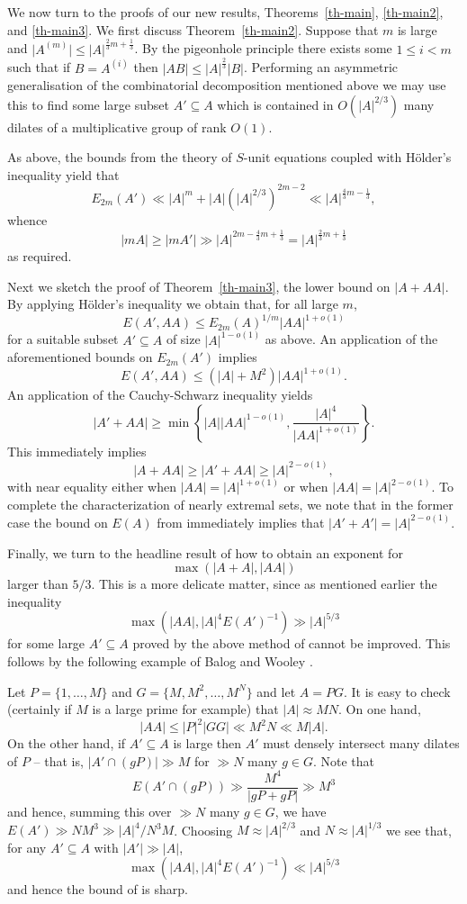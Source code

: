 \documentclass{amsart}
\renewcommand{\leq}{\leqslant}
\renewcommand{\geq}{\geqslant}
\newcommand{\abs}[1]{\left\lvert #1\right\rvert}
\newcommand{\Abs}[1]{\lvert #1\rvert}
\theoremstyle{definition}
\begin{document}
We now turn to the proofs of our new results, Theorems~\ref{th-main}, \ref{th-main2}, and \ref{th-main3}. We first discuss Theorem~\ref{th-main2}. Suppose that $m$ is large and $\Abs{A^{(m)}}\leq \abs{A}^{\frac{2}{3}m+\frac{1}{3}}$. By the pigeonhole principle there exists some $1\leq i<m$ such that if $B=A^{(i)}$ then $\abs{AB}\leq \abs{A}^{\frac{2}{3}}\abs{B}$. Performing an asymmetric generalisation of the combinatorial decomposition mentioned above we may use this to find some large subset $A'\subseteq A$ which is contained in $O(\abs{A}^{2/3})$ many dilates of a multiplicative group of rank $O(1)$. 

As above, the bounds from the theory of $S$-unit equations coupled with H\"{o}lder's inequality yield that
\[E_{2m}(A') \ll \abs{A}^m+\abs{A}(\abs{A}^{2/3})^{2m-2}\ll\abs{A}^{\frac{4}{3}m-\frac{1}{3}},\]
whence
\[\abs{mA}\geq \abs{mA'}\gg \abs{A}^{2m-\frac{4}{3}m+\frac{1}{3}}=\abs{A}^{\frac{2}{3}m+\frac{1}{3}}\]
as required.

Next we sketch the proof of Theorem~\ref{th-main3}, the lower bound on $\abs{A+AA}$. By applying H\"older's inequality we obtain that, for all large $m$,
\[ E(A', AA) \le E_{2m}(A)^{1/m} |AA|^{1+o(1)}\]
for a suitable subset $A' \subseteq A$ of size $\abs{A}^{1-o(1)}$ as above. An application of the aforementioned bounds on $E_{2m}(A')$ implies
\[ E(A', AA) \le (\abs{A} + M^2) |AA|^{1+o(1)}.\] An application of the Cauchy-Schwarz inequality yields
\[ |A'+AA| \ge \min\left\{ \abs{A} \abs{AA}^{1-o(1)} , \frac{\abs{A}^4}{\abs{AA}^{1+o(1)}}\right\}.\]
This immediately implies 
\[ \abs{A+AA} \ge \abs{A'+AA} \ge \abs{A}^{2-o(1)},\]
with near equality either when $\abs{AA} = \abs{A}^{1+o(1)}$ or when $\abs{AA} = \abs{A}^{2-o(1)}$. To complete the characterization of nearly extremal sets, we note that in the former case the bound on $E(A)$ from \cite{HRSZ25} immediately implies that $\abs{A'+A'} = \abs{A}^{2-o(1)}$.

Finally, we turn to the headline result of how to obtain an exponent for 
\[\max(\abs{A+A},\abs{AA})\]
larger than $5/3$. This is a more delicate matter, since as mentioned earlier the inequality
\[\max(\abs{AA},\abs{A}^4E(A')^{-1})\gg \abs{A}^{5/3}\]
for some large $A'\subseteq A$ proved by the above method of \cite{HRSZ25} cannot be improved. This follows by the following example of Balog and Wooley \cite{BaWo17}.

Let $P=\{1,\ldots,M\}$ and $G=\{M,M^2,\ldots,M^N\}$ and let $A=PG$. It is easy to check (certainly if $M$ is a large prime for example) that $\abs{A}\approx MN$. On one hand,
\[\abs{AA}\leq \abs{P}^2\abs{GG}\ll M^2N\ll M\abs{A}.\]
On the other hand, if $A'\subseteq A$ is large then $A'$ must densely intersect many dilates of $P$ -- that is, $\abs{A'\cap (gP)}\gg M$ for $\gg N$ many $g\in G$. Note that
\[E(A'\cap (gP))\gg \frac{M^4}{\abs{gP+gP}}\gg M^3\]
and hence, summing this over $\gg N$ many $g\in G$, we have $E(A')\gg NM^3\gg \abs{A}^4/N^3M$. Choosing $M\approx\abs{A}^{2/3}$ and $N\approx \abs{A}^{1/3}$ we see that, for any $A'\subseteq A$ with $\abs{A'}\gg \abs{A}$,
\[\max(\abs{AA}, \abs{A}^4E(A')^{-1})\ll \abs{A}^{5/3}\]
and hence the bound of \cite{HRSZ25} is sharp.
\end{document}
